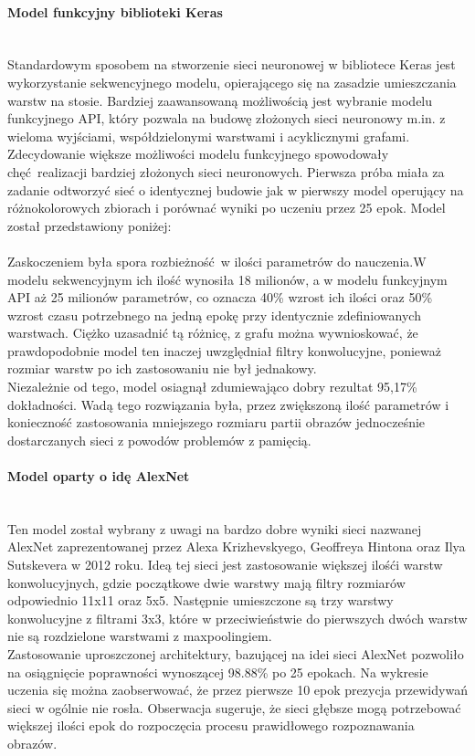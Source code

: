 \paragraph{Model funkcyjny biblioteki Keras} \mbox{}\\
Standardowym sposobem na stworzenie sieci neuronowej w bibliotece Keras jest wykorzystanie
sekwencyjnego modelu, opierającego się na zasadzie umieszczania warstw na stosie. Bardziej
zaawansowaną możliwością jest wybranie modelu funkcyjnego API, który pozwala na budowę złożonych
sieci neuronowy m.in. z wieloma wyjściami, współdzielonymi warstwami i acyklicznymi grafami.\\
Zdecydowanie większe możliwości modelu funkcyjnego spowodowały chęć realizacji bardziej złożonych
sieci neuronowych. Pierwsza próba miała za zadanie odtworzyć sieć o identycznej budowie jak w
pierwszy model operujący na różnokolorowych zbiorach i porównać wyniki po uczeniu przez 25 epok.
Model został przedstawiony poniżej:\\\\
Zaskoczeniem była spora rozbieżność w ilości parametrów do nauczenia.W modelu sekwencyjnym
ich ilość wynosiła 18 milionów, a w modelu funkcyjnym API aż 25 milionów parametrów, co oznacza
40\% wzrost ich ilości oraz 50\% wzrost czasu potrzebnego na jedną epokę przy identycznie
zdefiniowanych warstwach. Ciężko uzasadnić tą różnicę, z grafu można wywnioskować, że
prawdopodobnie model ten inaczej uwzględniał filtry konwolucyjne, ponieważ rozmiar warstw
po ich zastosowaniu nie był jednakowy.\\
Niezależnie od tego, model osiagnął zdumiewająco dobry rezultat 95,17\% dokładności.
Wadą tego rozwiązania była, przez zwiększoną ilość parametrów i konieczność zastosowania
mniejszego rozmiaru partii obrazów jednocześnie dostarczanych sieci z powodów
problemów z pamięcią.

\paragraph{Model oparty o idę AlexNet} \mbox{}\\
Ten model został wybrany z uwagi na bardzo dobre wyniki sieci nazwanej AlexNet zaprezentowanej
przez Alexa Krizhevskyego, Geoffreya Hintona oraz Ilya Sutskevera w 2012 roku. Ideą tej sieci
jest zastosowanie większej ilośći warstw konwolucyjnych, gdzie początkowe dwie warstwy mają
filtry rozmiarów odpowiednio 11x11 oraz 5x5. Następnie umieszczone są trzy warstwy konwolucyjne
z filtrami 3x3, które w przeciwieństwie do pierwszych dwóch warstw nie są rozdzielone
warstwami z maxpoolingiem.\\
Zastosowanie uproszczonej architektury, bazującej na idei sieci AlexNet pozwoliło
na osiągnięcie poprawności wynoszącej 98.88\% po 25 epokach. Na wykresie uczenia się
można zaobserwować, że przez pierwsze 10 epok prezycja przewidywań sieci w ogólnie nie
rosła. Obserwacja sugeruje, że sieci głębsze mogą potrzebować większej ilości epok
do rozpoczęcia procesu prawidłowego rozpoznawania obrazów.


